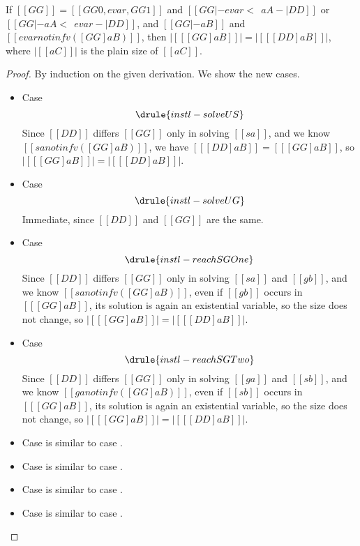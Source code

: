 \begin{lemma} \label{lemma:dec:instan}
  If $[[GG]] = [[ GG0, evar, GG1 ]]$ and $[[  GG |- evar  <~~ aA -| DD ]]$
  or $[[ GG |- aA <~~ evar -| DD  ]]$, and $[[GG |- aB]]$ and $[[evar notin fv( [GG]aB )]]$, then $ | [[   [GG]aB   ]] | = | [[   [DD]aB   ]] | $, where $| [[   aC  ]] | $ is the plain size of $[[aC]]$.
\end{lemma}
\begin{proof}
  By induction on the given derivation. We show the new cases.
  \begin{itemize}
  \item Case \[ \drule{instl-solveUS} \]
    Since $[[DD]]$ differs $[[GG]]$ only in solving $[[sa]]$, and we know $[[ sa notin fv([GG]aB)  ]]  $, we have $[[  [DD]aB  ]] = [[  [GG]aB ]]$, so
    $ | [[   [GG]aB   ]] | = | [[   [DD]aB   ]] | $.

  \item Case \[  \drule{instl-solveUG}   \]
    Immediate, since $[[DD]]$ and $[[GG]]$ are the same.

  \item Case \[   \drule{instl-reachSGOne}   \]
    Since $[[DD]]$ differs $[[GG]]$ only in solving $[[sa]]$ and $[[gb]]$, and we know $[[ sa notin fv([GG]aB)  ]]  $,
    even if $[[gb]]$ occurs in $[[  [GG]aB]]$, its solution is again an existential variable, so the size does not change,
    so $ | [[   [GG]aB   ]] | = | [[   [DD]aB   ]] | $.

  \item Case \[   \drule{instl-reachSGTwo}   \]
    Since $[[DD]]$ differs $[[GG]]$ only in solving $[[ga]]$ and $[[sb]]$, and we know $[[ ga notin fv([GG]aB)  ]]  $,
    even if $[[sb]]$ occurs in $[[  [GG]aB]]$, its solution is again an existential variable, so the size does not change,
    so $ | [[   [GG]aB   ]] | = | [[   [DD]aB   ]] | $.

  \item Case  is similar to case .
  \item Case  is similar to case .
  \item Case  is similar to case .
  \item Case  is similar to case .

  \end{itemize}
\end{proof}


